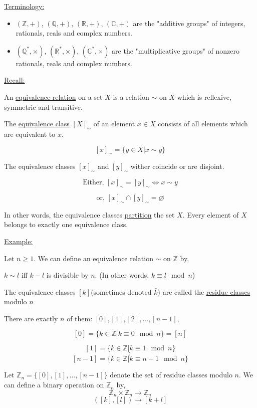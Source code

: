 \documentclass{article}
\theoremstyle{definition}
\begin{document}
\noindent\underline{Terminology:}
\begin{itemize}
    \item $(\mathbb{Z},+)$, $(\mathbb{Q},+)$, $(\mathbb{R},+)$, $(\mathbb{C},+)$ are the "additive groups" of integers, rationals, reals and complex numbers.
    \item $(\mathbb{Q}^*,\times)$, $(\mathbb{R}^*,\times)$, $(\mathbb{C}^*,\times)$ are the "multiplicative groups" of nonzero rationals, reals and complex numbers.
\end{itemize}

\noindent\underline{Recall:}

\noindent An \underline{equivalence relation} on a set $X$ is a relation $\sim$ on $X$ which is reflexive, symmetric and transitive.

The \underline{equivalence class} $[X]_\sim$ of an element $x\in X$ consists of all elements which are equivalent to $x$.

$$[x]_\sim=\{y\in X|x\sim y\}$$

The equivalence classes $[x]_\sim$ and $[y]_\sim$ wither coincide or are disjoint.

$$\text{Either,   }[x]_\sim=[y]_\sim\Leftrightarrow x\sim y$$

$$\text{or,   }[x]_\sim\cap[y]_\sim=\varnothing$$

In other words, the equivalence classes \underline{partition} the set $X$. Every element of $X$ belongs to exactly one equivalence class.

\noindent\underline{Example:}

\noindent Let $n\ge1$. We can define an equivalence relation $\sim$ on $\mathbb{Z}$ by,

$k\sim l$ iff $k-l$ is divisible by $n$. (In other words, $k\equiv l\mod n$)

\noindent The equivalence classes $[k]$(sometimes denoted $\bar{k}$) are called the \underline{residue classes modulo $n$}

There are exactly $n$ of them: $[0],[1],[2],...,[n-1]$,

$$[0]=\{k\in\mathbb{Z}|k\equiv 0\mod n\}=[n]$$

$$[1]=\{k\in\mathbb{Z}|k\equiv 1\mod n\}$$
$$:$$
$$[n-1]=\{k\in\mathbb{Z}|k\equiv n-1\mod n\}$$

Let $\mathbb{Z}_n=\{[0],[1],...,[n-1]\}$ denote the set of residue classes modulo $n$. We can define a binary operation on $\mathbb{Z}_n$ by,
$$\mathbb{Z}_n\times\mathbb{Z}_n\to\mathbb{Z}_n$$
$$([k],[l])\to[k+l]$$
\end{document}
